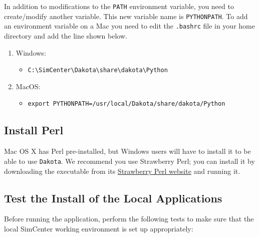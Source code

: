 In addition to modifications to the \texttt{PATH} environment variable, you need to create/modify another variable. This new variable name is \texttt{PYTHONPATH}. To add an environment variable on a Mac you need to edit the \texttt{.bashrc} file in your home directory and add the line shown below.

\begin{enumerate}
\item Windows:
\begin{itemize}
    \item \texttt{C:\textbackslash SimCenter\textbackslash Dakota\textbackslash share\textbackslash dakota\textbackslash Python}
\end{itemize}

\item MacOS:
\begin{itemize}
    \item \texttt{export PYTHONPATH=/usr/local/Dakota/share/dakota/Python}
\end{itemize}
\end{enumerate}

\subsection{Install  Perl}

Mac OS X has Perl pre-installed, but Windows users will have to
install it to be able to use \texttt{Dakota}. We recommend you use Strawberry
Perl; you can install it by downloading the executable from
its \href{http://strawberryperl.com}{Strawberry Perl website} and
running it.

\subsection{Test the Install of the Local Applications}

Before running the \texttt{\getsoftwarename{}} application, perform the following tests to
make sure that the local SimCenter working environment is set up
appropriately:

